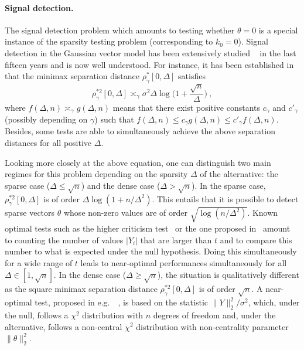 \documentclass[twoside,11pt]{article}
\newcommand{\<}{\langle}
\renewcommand{\>}{\rangle}
\begin{document}
\paragraph{Signal detection.} The signal detection problem which amounts to testing whether $\theta=0$ is a special instance of the sparsity testing problem (corresponding to $k_0 = 0$). Signal detection in the Gaussian vector model has been extensively studied ~\cite{ingster2012nonparametric,baraud02,jin2004, collier2015minimax} in the last fifteen years and is now well understood. For instance, it has been established in~\cite{collier2015minimax} that the minimax separation distance $\rho_{\gamma}^{*}[0,\Delta]$ satisfies
$$\rho_{\gamma}^{*2}[0,\Delta] \asymp_{\gamma} \sigma^2 \Delta\log\big(1+\frac{\sqrt{n}}{\Delta}\big)\ ,$$
where $f(\Delta,n) \asymp_{\gamma} g(\Delta,n)$ means that there exist  positive  constants $c_{\gamma}$ and $c'_{\gamma}$ (possibly depending on $\gamma$) such that 
$f(\Delta,n)\leq c_{\gamma}  g(\Delta,n)\leq c'_{\gamma}f(\Delta,n)$. Besides, some tests are able to simultaneously achieve the above separation distances for all positive $\Delta$. 


Looking more closely at the above equation, one can distinguish two main regimes for this problem depending on the sparsity $\Delta$ of the alternative: the sparse case ($\Delta\leq \sqrt{n}$) and the dense case ($\Delta>\sqrt{n}$). In the sparse case, $\rho_{\gamma}^{*2}[0,\Delta]$ is of order $\Delta \log(1+ n/\Delta^2)$. This entails that it is possible to detect sparse vectors $\theta$ whose non-zero values are of order $\sqrt{\log(n/\Delta^2)}$. Known optimal tests such as the higher criticism test~\cite{jin2004} or the one proposed in~\cite{collier2015minimax} amount to counting the number of values $|Y_i|$ that are larger than $t$ and to compare this number to what is expected under the null hypothesis. Doing this simultaneously for a wide range of $t$ leads to near-optimal performances simultaneously for all $\Delta\in [1,\sqrt{n}]$. In the dense case ($\Delta\geq \sqrt{n}$), the situation is qualitatively different as the square minimax separation distance $\rho_{\gamma}^{*2}[0,\Delta]$ is of order $\sqrt{n}$. A near-optimal test, proposed in e.g.\ ~\cite{baraud02}, is based on the statistic $\|Y\|_2^2/\sigma^2$, which, under the null, follows a $\chi^2$ distribution with $n$ degrees of freedom and, under the alternative, follows a non-central $\chi^2$ distribution with non-centrality parameter $\|\theta\|_2^2$. 
\end{document}
